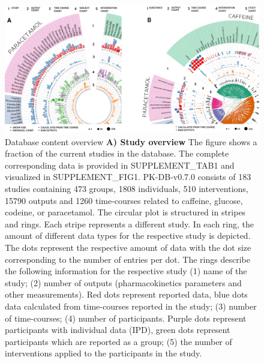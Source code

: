 \documentclass[a4,center,fleqn]{NAR}
\begin{document}
\begin{figure}[t]
\begin{center}
\includegraphics{NAR-fig3.png}
\end{center}
\caption{Database content overview
\textbf{ A) Study overview} The figure shows a fraction of the current studies in the database. The complete corresponding data is provided in SUPPLEMENT\_TAB1 and visualized in SUPPLEMENT\_FIG1. PK-DB-v0.7.0 consists of 183 studies containing 473 groups, 1808 individuals, 510 interventions, 15790 outputs and 1260 time-courses related to caffeine, glucose, codeine, or paracetamol. The circular plot is structured in stripes and rings. Each stripe represents a different study. In each ring, the amount of different data types for the respective study is depicted. The dots represent the respective amount of data with the dot size corresponding to the number of entries per dot. The rings describe the following information for the respective study (1) name of the study; (2) number of outputs (pharmacokinetics parameters and other measurements). Red dots represent reported data, blue dots data calculated from time-courses reported in the study; (3) number of time-courses; (4) number of participants. Purple dots represent participants with individual data (IPD), green dots represent participants which are reported as a group; (5) the number of interventions applied to the participants in the study.
}
\end{figure}
\end{document}
